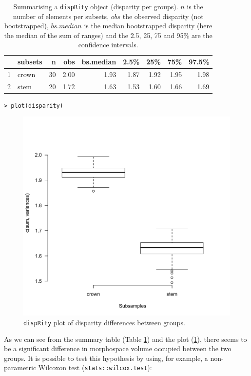 \documentclass[12pt,letterpaper]{article}
\newcommand{\disp}{\texttt{dispRity} }
\begin{document}
\begin{table}[ht]
\centering
\begin{tabular}{rlrrrrrrr}
  \hline
 & subsets & n & obs & bs.median & 2.5\% & 25\% & 75\% & 97.5\% \\ 
  \hline
1 & crown &  30 & 2.00 & 1.93 & 1.87 & 1.92 & 1.95 & 1.98 \\ 
  2 & stem &  20 & 1.72 & 1.63 & 1.53 & 1.60 & 1.66 & 1.69 \\ 
   \hline
\end{tabular}
\caption{Summarising a \disp object (disparity per groups). $n$ is the number of elements per subsets, $obs$ the observed disparity (not bootstrapped), $bs.median$ is the median bootstrapped disparity (here the median of the sum of ranges) and the 2.5, 25, 75 and 95\% are the confidence intervals.}
\label{Tab:summary_group}
\end{table}

\noindent \texttt{> plot(disparity)}

\begin{figure}[!htbp]
\centering
   \includegraphics[width=1\textwidth]{plot_example_group.pdf} 
\caption{\disp plot of disparity differences between groups.}
\label{Fig:plot_group}
\end{figure}

As we can see from the summary table (Table \ref{Tab:summary_group}) and the plot (\ref{Fig:plot_group}), there seems to be a significant difference in morphospace volume occupied between the two groups.
It is possible to test this hypothesis by using, for example, a non-parametric Wilcoxon test (\texttt{stats::wilcox.test}):
\end{document}
